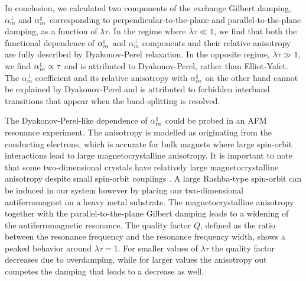 In conclusion, we calculated two components of the exchange Gilbert damping, $\alpha_m^\perp$ and $\alpha_m^{\scriptscriptstyle\parallel}$ corresponding to perpendicular-to-the-plane and parallel-to-the-plane damping, as a function of $\lambda\tau$. In the regime where $\lambda\tau\ll1$, we find that both the functional dependence of $\alpha_m^{\scriptscriptstyle\parallel}$ and $\alpha_m^\perp$ components and their relative anisotropy are fully described by Dyakonov-Perel relaxation. In the opposite regime, $\lambda\tau\gg1$, we find $\alpha_m^{\scriptscriptstyle\parallel}\propto \tau$ and is attributed to Dyakonov-Perel, rather than Elliot-Yafet. The $\alpha_m^\perp$ coefficient and its relative anisotropy with $\alpha_m^{\scriptscriptstyle\parallel}$  on the other hand cannot be explained by Dyakonov-Perel and is attributed to forbidden interband transitions that appear when the band-splitting is resolved. 

The Dyakonov-Perel-like dependence of $\alpha_m^{\scriptscriptstyle\parallel}$ could be probed in an AFM resonance experiment. The anisotropy is modelled as originating from the conducting electrons, which is accurate for bulk magnets where large spin-orbit interactions lead to large magnetocrystalline anisotropy. It is important to note that some two-dimensional crystals  have relatively large magnetocrystalline anisotropy despite small spin-orbit couplings \cite{dieny_perpendicular_2017}. A large Rashba-type spin-orbit can be induced in our system however by placing our two-dimensional antiferromagnet on a heavy metal substrate. The magnetocrystalline anisotropy together with the parallel-to-the-plane Gilbert damping  leads to a widening of the antiferromagnetic resonance. The quality factor $Q$, defined as the ratio between the resonance frequency and the resonance frequency width, shows a peaked behavior around $\lambda\tau=1$. For smaller values of $\lambda\tau$ the quality factor decreases due to overdamping, while for larger values the anisotropy out competes the damping that leads to a decrease as well.

